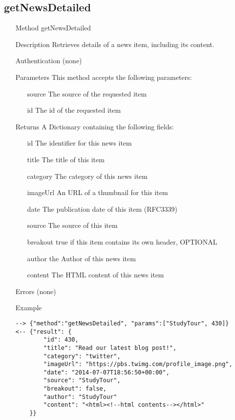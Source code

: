 \documentclass[a4paper]{scrreprt}
\begin{document}
\subsection{getNewsDetailed}
\begin{enumerate}
\item[Method] getNewsDetailed
\item[Description] Retrieves details of a news item, including its content.
\item[Authentication] (none)
\item[Parameters] This method accepts the following parameters:
\begin{enumerate}
	\item[source] The source of the requested item
	\item[id] The id of the requested item
    \end{enumerate}
\item[Returns] A Dictionary containing the following fields:
\begin{enumerate}
    \item[id] The identifier for this news item
    \item[title] The title of this item
	\item[category] The category of this news item
    \item[imageUrl] An URL of a thumbnail for this item
    \item[date] The publication date of this item (RFC3339)
    \item[source] The source of this item
    \item[breakout] true if this item contains its own header, OPTIONAL
    \item[author] the Author of this news item
    \item[content] The HTML content of this news item
	\end{enumerate}
\item[Errors] (none)
\item[Example]
\begin{lstlisting}
--> {"method":"getNewsDetailed", "params":["StudyTour", 430]}
<-- {"result": {
        "id": 430,
        "title": "Read our latest blog post!",
        "category": "twitter",
        "imageUrl": "https://pbs.twimg.com/profile_image.png",
        "date": "2014-07-07T18:56:50+00:00",
        "source": "StudyTour",
        "breakout": false,
        "author": "StudyTour"
        "content": "<html><!--html contents--></html>"
    }}
\end{lstlisting}
\end{enumerate}
\end{document}
